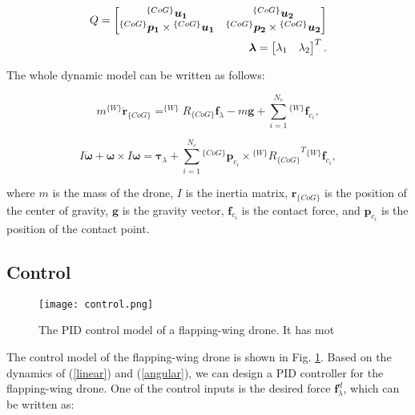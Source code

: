     \begin{align}
    Q =
    \begin{bmatrix}
    {}^{\{CoG\}}\bm{u_1} & {}^{\{CoG\}}\bm{u_{2}} \\
    {}^{\{CoG\}}\bm{p_1} \times {}^{\{CoG\}}\bm{u_1} & {}^{\{CoG\}}\bm{p_{2}} \times {}^{\{CoG\}}\bm{u_{2}}
    \end{bmatrix}\notag\\
    \bm{\lambda} =
    \begin{bmatrix}
    \lambda_1 
    \quad
    \lambda_2
    \end{bmatrix}^T.
    \end{align}

    The whole dynamic model can be written as follows:

    \begin{equation}
      \label{linear}
        m^{\{W\}}\bm{\ddot{r}}_{\{CoG\}} = ^{\{W\}}R_{\{CoG\}} \bm{f}_{\lambda} - m \bm{g} + \sum_{i=1}^{N_c} {^{\{W\}} \bm{f}_{c_i}}, 
    \end{equation}
    
    \begin{equation}
      \label{angular}
        I \bm{\dot{\omega}} + \bm{\omega} \times I\bm{\omega}  = \bm{\tau}_{\lambda} + \sum_{i=1}^{N_c} {^{\{CoG\}} \bm{p}_{c_i} \times {^{\{W\}} R_{\{CoG\}}}^{T} {^{\{W\}} \bm{f}_{c_i}}},
    \end{equation}
    
    where $m$ is the mass of the drone, $I$ is the inertia matrix, $\bm{r}_{\{CoG\}}$ is the position of the center of gravity, $\bm{g}$ is the gravity vector, $\bm{f}_{c_i}$ is the contact force, and $\bm{p}_{c_i}$ is the position of the contact point.

\subsection{Control}

\begin{figure}[t]
  \centering
  \texttt{[image: control.png]}
  \caption{The PID control model of a flapping-wing drone. It has mot}
  \label{figure:control}
\end{figure}

The control model of the flapping-wing drone is shown in Fig. \ref{figure:control}.
Based on the dynamics of (\ref{linear}) and (\ref{angular}), 
we can design a PID controller for the flapping-wing drone. 
One of the control inputs is the desired force $\bm{f}_{\lambda}^{d}$, which can be written as:

